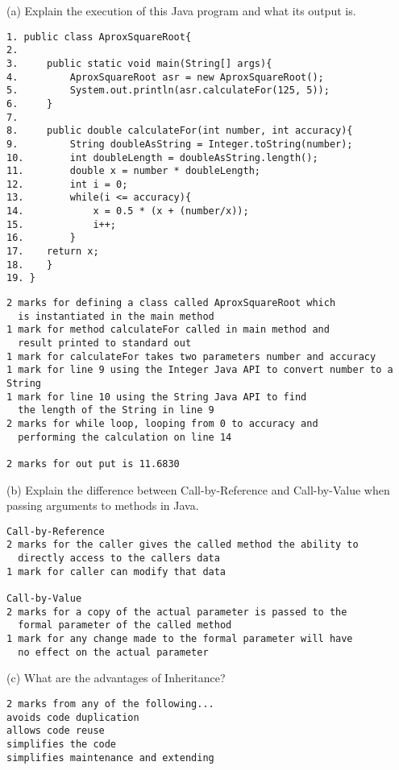 \documentclass{exam}
\begin{document}
\begin{question}
\item[(a)]
Explain the execution of this Java program and what its output is.
\begin{lstlisting}
1. public class AproxSquareRoot{
2.
3.     public static void main(String[] args){
4.         AproxSquareRoot asr = new AproxSquareRoot();
5.         System.out.println(asr.calculateFor(125, 5));
6.     }
7.	
8.     public double calculateFor(int number, int accuracy){
9.         String doubleAsString = Integer.toString(number);
10.        int doubleLength = doubleAsString.length();
11.        double x = number * doubleLength;
12.        int i = 0;
13.        while(i <= accuracy){
14.            x = 0.5 * (x + (number/x));
15.            i++;
16.        }
17.    return x;
18.    }
19. }
\end{lstlisting}
\color{red}
\begin{lstlisting}
2 marks for defining a class called AproxSquareRoot which 
  is instantiated in the main method
1 mark for method calculateFor called in main method and 
  result printed to standard out
1 mark for calculateFor takes two parameters number and accuracy 
1 mark for line 9 using the Integer Java API to convert number to a String
1 mark for line 10 using the String Java API to find 
  the length of the String in line 9
2 marks for while loop, looping from 0 to accuracy and 
  performing the calculation on line 14
  
2 marks for out put is 11.6830
\end{lstlisting}
\color{black}

\item[(b)]
Explain the difference between Call-by-Reference and Call-by-Value when passing arguments to methods in Java.
\color{red}
\begin{lstlisting}
Call-by-Reference 
2 marks for the caller gives the called method the ability to 
  directly access to the callers data 
1 mark for caller can modify that data

Call-by-Value 
2 marks for a copy of the actual parameter is passed to the 
  formal parameter of the called method
1 mark for any change made to the formal parameter will have 
  no effect on the actual parameter
\end{lstlisting}
\color{black}

\item[(c)]
What are the advantages of Inheritance?
\color{red}
\begin{lstlisting}
2 marks from any of the following...
avoids code duplication
allows code reuse
simplifies the code
simplifies maintenance and extending
\end{lstlisting}
\color{black}


\end{question}
\end{document}
